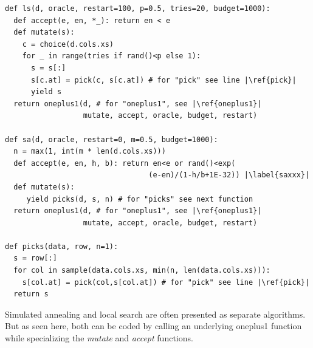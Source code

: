 \documentclass[AMA,STIX2COL]{WileyNJDv5}
\begin{document}
\begin{verbatim}
def ls(d, oracle, restart=100, p=0.5, tries=20, budget=1000): 
  def accept(e, en, *_): return en < e
  def mutate(s):
    c = choice(d.cols.xs)
    for _ in range(tries if rand()<p else 1):
      s = s[:]
      s[c.at] = pick(c, s[c.at]) # for "pick" see line |\ref{pick}|
      yield s
  return oneplus1(d, # for "oneplus1", see |\ref{oneplus1}|
                  mutate, accept, oracle, budget, restart)
 
def sa(d, oracle, restart=0, m=0.5, budget=1000): 
  n = max(1, int(m * len(d.cols.xs)))
  def accept(e, en, h, b): return en<e or rand()<exp(
                                 (e-en)/(1-h/b+1E-32)) |\label{saxxx}|
  def mutate(s): 
     yield picks(d, s, n) # for "picks" see next function
  return oneplus1(d, # for "oneplus1", see |\ref{oneplus1}|
                  mutate, accept, oracle, budget, restart)

def picks(data, row, n=1): 
  s = row[:]
  for col in sample(data.cols.xs, min(n, len(data.cols.xs))):
    s[col.at] = pick(col,s[col.at]) # for "pick" see line |\ref{pick}|
  return s
\end{verbatim}
Simulated annealing and local search are often presented as separate
algorithms. But as seen here, both can be coded by calling an
underlying \textsf{oneplus1} function while specializing the
{\em mutate} and {\em accept} functions.
\end{document}
